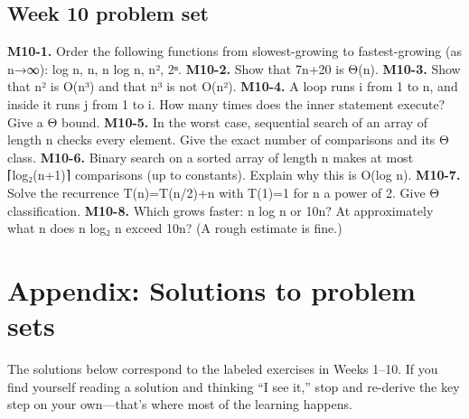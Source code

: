 \documentclass[11pt]{article}
\begin{document}
\subsection*{Week 10 problem set}
\textbf{M10-1.} Order the following functions from slowest-growing to fastest-growing (as n→∞):
log n, n, n log n, n², 2ⁿ.
\textbf{M10-2.} Show that 7n+20 is Θ(n).
\textbf{M10-3.} Show that n² is O(n³) and that n³ is not O(n²).
\textbf{M10-4.} A loop runs i from 1 to n, and inside it runs j from 1 to i. How many times does
the inner statement execute? Give a Θ bound.
\textbf{M10-5.} In the worst case, sequential search of an array of length n checks every
element. Give the exact number of comparisons and its Θ class.
\textbf{M10-6.} Binary search on a sorted array of length n makes at most ⌈log₂(n+1)⌉
comparisons (up to constants). Explain why this is O(log n).
\textbf{M10-7.} Solve the recurrence T(n)=T(n/2)+n with T(1)=1 for n a power of 2. Give Θ
classification.
\textbf{M10-8.} Which grows faster: n log n or 10n? At approximately what n does n log₂ n
exceed 10n? (A rough estimate is fine.)

\appendix
\clearpage
\section{Appendix: Solutions to problem sets}
The solutions below correspond to the labeled exercises in Weeks 1–10. If you find
yourself reading a solution and thinking “I see it,” stop and re-derive the key step on your
own—that’s where most of the learning happens.
\end{document}
